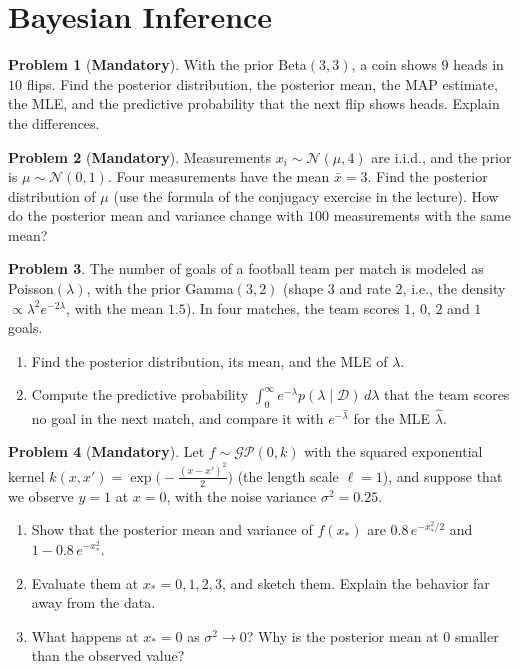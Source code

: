 \documentclass[11pt]{article}
\theoremstyle{definition}
\newtheorem{problem}{Problem}[section]
\newcommand{\mandatory}{\textcolor{red!70!black}{\textbf{Mandatory}}}
\begin{document}
\section{Bayesian Inference}

\begin{problem}[\mandatory]\label{pr:beta-update}
    With the prior Beta$(3, 3)$, a coin shows $9$ heads in $10$ flips. Find the posterior distribution, the posterior mean, the MAP estimate, the MLE, and the predictive probability that the next flip shows heads. Explain the differences.
\end{problem}

\begin{problem}[\mandatory]\label{pr:gauss-gauss}
    Measurements $x_i \sim \mathcal{N}(\mu, 4)$ are i.i.d., and the prior is $\mu \sim \mathcal{N}(0, 1)$. Four measurements have the mean $\bar x = 3$. Find the posterior distribution of $\mu$ (use the formula of the conjugacy exercise in the lecture). How do the posterior mean and variance change with $100$ measurements with the same mean?
\end{problem}

\begin{problem}\label{pr:gamma-poisson}
    The number of goals of a football team per match is modeled as Poisson$(\lambda)$, with the prior Gamma$(3, 2)$ (shape $3$ and rate $2$, i.e., the density $\propto \lambda^2e^{-2\lambda}$, with the mean $1.5$). In four matches, the team scores $1$, $0$, $2$ and $1$ goals.
    \begin{enumerate}[label=(\alph*)]
        \item Find the posterior distribution, its mean, and the MLE of $\lambda$.
        \item Compute the predictive probability $\int_0^\infty e^{-\lambda}p(\lambda \mid \mathcal{D})\, d\lambda$ that the team scores no goal in the next match, and compare it with $e^{-\hat\lambda}$ for the MLE $\hat\lambda$.
    \end{enumerate}
\end{problem}

\begin{problem}[\mandatory]\label{pr:gp-one-point}
    Let $f \sim \mathcal{GP}(0, k)$ with the squared exponential kernel $k(x, x') = \exp\big(-\frac{(x - x')^2}{2}\big)$ (the length scale $\ell = 1$), and suppose that we observe $y = 1$ at $x = 0$, with the noise variance $\sigma^2 = 0.25$.
    \begin{enumerate}[label=(\alph*)]
        \item Show that the posterior mean and variance of $f(x_*)$ are $0.8\,e^{-x_*^2/2}$ and $1 - 0.8\,e^{-x_*^2}$.
        \item Evaluate them at $x_* = 0, 1, 2, 3$, and sketch them. Explain the behavior far away from the data.
        \item What happens at $x_* = 0$ as $\sigma^2 \to 0$? Why is the posterior mean at $0$ smaller than the observed value?
    \end{enumerate}
\end{problem}
\end{document}
